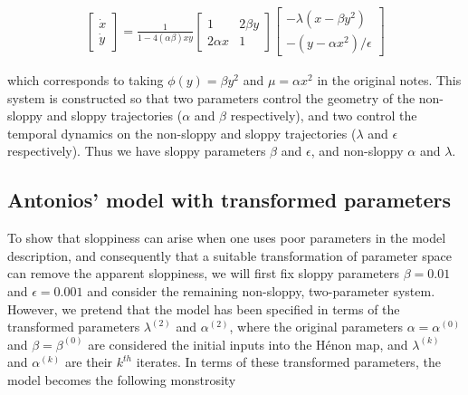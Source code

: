 \documentclass[11pt]{article}
\begin{document}
\begin{align*}
  \begin{bmatrix} \dot{x} \\ \dot{y} \end{bmatrix}  = \frac{1}{1 -
  4 (\alpha \beta) x y} \begin{bmatrix} 1 & 2\beta y \\ 2\alpha x &
  1 \end{bmatrix} \begin{bmatrix} -\lambda(x - \beta y^2) \\ -(y -
  \alpha x^2)/\epsilon \end{bmatrix}
\end{align*}

which corresponds to taking $\phi(y) = \beta y^2$ and $\mu = \alpha x^2$ in the
original notes. This system is constructed so that two parameters
control the geometry of the non-sloppy and sloppy trajectories
($\alpha$ and $\beta$ respectively), and two control the temporal dynamics on
the non-sloppy and sloppy trajectories ($\lambda$ and $\epsilon$
respectively). Thus we have sloppy parameters $\beta$ and $\epsilon$,
and non-sloppy $\alpha$ and $\lambda$. \\

\subsection{Antonios' model with transformed parameters}


To show that sloppiness can arise when one uses poor parameters in the
model description, and consequently that a suitable transformation of
parameter space can remove the apparent sloppiness, we will first fix
sloppy parameters $\beta = 0.01$ and $\epsilon = 0.001$ and consider
the remaining non-sloppy, two-parameter system. However, we pretend
that the model has been specified in terms of the transformed
parameters $\lambda^{(2)}$ and $\alpha^{(2)}$, where the original
parameters $\alpha = \alpha^{(0)}$ and $\beta = \beta^{(0)}$ are
considered the initial inputs into the H\'{e}non map, and
$\lambda^{(k)}$ and $\alpha^{(k)}$ are their $k^{th}$ iterates. In
terms of these transformed parameters, the model becomes the following
monstrosity
\end{document}
